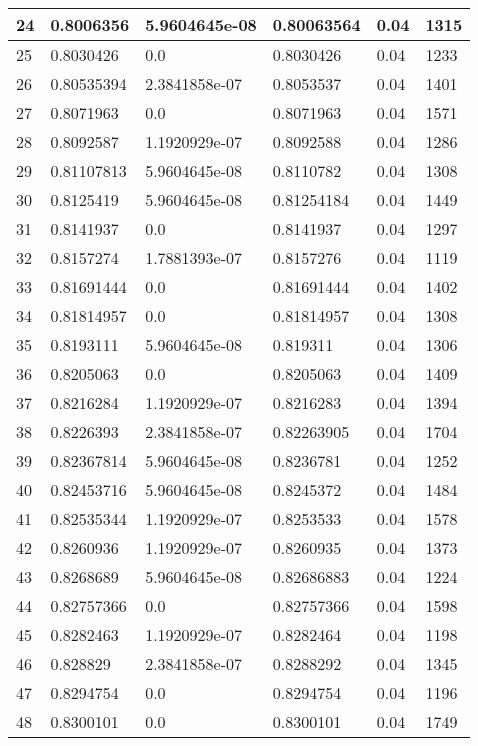 \begin{longtable}{|l|l|l|l|l|l|}
24 & 0.8006356 & 5.9604645e-08 & 0.80063564 & 0.04 & 1315 \\ \hline 
25 & 0.8030426 & 0.0 & 0.8030426 & 0.04 & 1233 \\ \hline 
26 & 0.80535394 & 2.3841858e-07 & 0.8053537 & 0.04 & 1401 \\ \hline 
27 & 0.8071963 & 0.0 & 0.8071963 & 0.04 & 1571 \\ \hline 
28 & 0.8092587 & 1.1920929e-07 & 0.8092588 & 0.04 & 1286 \\ \hline 
29 & 0.81107813 & 5.9604645e-08 & 0.8110782 & 0.04 & 1308 \\ \hline 
30 & 0.8125419 & 5.9604645e-08 & 0.81254184 & 0.04 & 1449 \\ \hline 
31 & 0.8141937 & 0.0 & 0.8141937 & 0.04 & 1297 \\ \hline 
32 & 0.8157274 & 1.7881393e-07 & 0.8157276 & 0.04 & 1119 \\ \hline 
33 & 0.81691444 & 0.0 & 0.81691444 & 0.04 & 1402 \\ \hline 
34 & 0.81814957 & 0.0 & 0.81814957 & 0.04 & 1308 \\ \hline 
35 & 0.8193111 & 5.9604645e-08 & 0.819311 & 0.04 & 1306 \\ \hline 
36 & 0.8205063 & 0.0 & 0.8205063 & 0.04 & 1409 \\ \hline 
37 & 0.8216284 & 1.1920929e-07 & 0.8216283 & 0.04 & 1394 \\ \hline 
38 & 0.8226393 & 2.3841858e-07 & 0.82263905 & 0.04 & 1704 \\ \hline 
39 & 0.82367814 & 5.9604645e-08 & 0.8236781 & 0.04 & 1252 \\ \hline 
40 & 0.82453716 & 5.9604645e-08 & 0.8245372 & 0.04 & 1484 \\ \hline 
41 & 0.82535344 & 1.1920929e-07 & 0.8253533 & 0.04 & 1578 \\ \hline 
42 & 0.8260936 & 1.1920929e-07 & 0.8260935 & 0.04 & 1373 \\ \hline 
43 & 0.8268689 & 5.9604645e-08 & 0.82686883 & 0.04 & 1224 \\ \hline 
44 & 0.82757366 & 0.0 & 0.82757366 & 0.04 & 1598 \\ \hline 
45 & 0.8282463 & 1.1920929e-07 & 0.8282464 & 0.04 & 1198 \\ \hline 
46 & 0.828829 & 2.3841858e-07 & 0.8288292 & 0.04 & 1345 \\ \hline 
47 & 0.8294754 & 0.0 & 0.8294754 & 0.04 & 1196 \\ \hline 
48 & 0.8300101 & 0.0 & 0.8300101 & 0.04 & 1749 \\ \hline 

\end{longtable}
